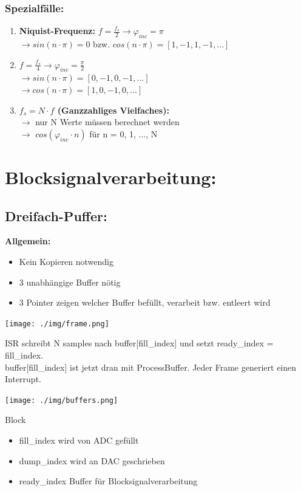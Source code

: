 \documentclass[10pt,a4paper]{article}
\begin{document}
\subsubsection{Spezialfälle:}
\begin{enumerate}
  \item \textbf{Niquist-Frequenz: }$f=\frac{f_s}{2} \rightarrow \varphi_{inc} = \pi$\\
  $\rightarrow sin(n\cdot\pi) = 0$ bzw. $cos(n\cdot\pi) = [1, -1, 1, -1, ...]$
  \item $f=\frac{f_s}{4} \rightarrow \varphi_{inc} = \frac{\pi}{2}$\\
  $\rightarrow sin(n\cdot\pi) = [0, -1, 0, -1, ...]$\\ 
  $\rightarrow cos(n\cdot\pi) = [1, 0, -1, 0, ...]$
  \item \textbf{$f_s= N \cdot f$ (Ganzzahliges Vielfaches):} \\
  $\rightarrow$ nur N Werte müssen berechnet werden\\
  $\rightarrow$ $cos(\varphi_{inc}\cdot n)$ für n = 0, 1, ..., N
 
\end{enumerate}

\section{Blocksignalverarbeitung:}
\subsection{Dreifach-Puffer:}
\textbf{Allgemein:}
\begin{itemize}
  \item Kein Kopieren notwendig
  \item 3 unabhängige Buffer nötig
  \item 3 Pointer zeigen welcher Buffer befüllt, verarbeit bzw. entleert wird  
\end{itemize}

  \begin{center}
      \texttt{[image: ./img/frame.png]}
  \end{center}
ISR schreibt N samples nach buffer[fill\_index] und setzt ready\_index = fill\_index.\\ 
buffer[fill\_index] ist jetzt dran mit ProcessBuffer.
Jeder Frame generiert einen Interrupt.
  \begin{center}
      \texttt{[image: ./img/buffers.png]}
  \end{center}
  Block
\begin{itemize}
    \item fill\_index wird von ADC gefüllt
    \item dump\_index wird an DAC geschrieben
    \item ready\_index Buffer für Blocksignalverarbeitung
\end{itemize}
\end{document}
